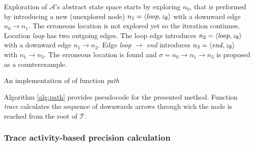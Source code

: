 \begin{runningExample}
	Exploration of $\mathcal{A}$'s abstract state space starts by exploring $n_0$, that is performed by introducing a new (unexplored node) $n_1=\langle \text{\emph{loop}}, z_\emptyset \rangle$ with a downward edge $n_0 \to n_1$. The erroneous location is not explored yet so the iteration continues. Location \emph{loop} has two outgoing edges. The loop edge introduces $n_2=\langle \text{\emph{loop}}, z_\emptyset \rangle$ with a downward edge $n_1 \to n_2$. Edge \emph{loop} $\to$ \emph{end} introduces $n_3=\langle \text{\emph{end}}, z_\emptyset \rangle$ with $n_1 \to n_3$. The erroneous location is found and $\sigma= n_0 \to n_1 \to n_3$ is proposed as a counterexample.
\end{runningExample}

\begin{algorithm}
	\BlankLine
	\KwRet{\o} 
	\caption{An implementation of of function \emph{path}} \label{alg:path}
\end{algorithm}

Algorithm \ref{alg:path} provides pseudocode for the presented method. Function \emph{trace} calculates the sequence of downwards arrows through wich the node is reached from the root of $\mathcal{T}$. 

\subsubsection{Trace activity-based precision calculation}

